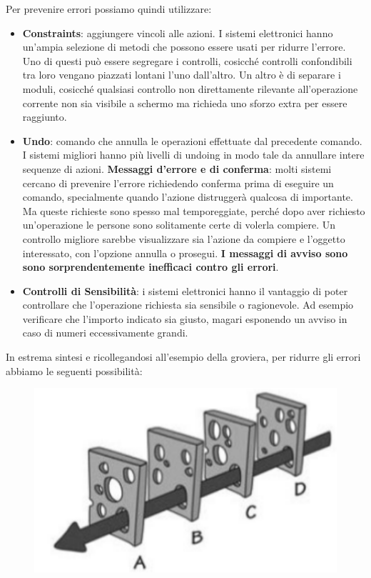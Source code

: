 \documentclass[a4paper,11pt,oneside]{book}
\begin{document}
Per prevenire errori possiamo quindi utilizzare:
\begin{itemize}
	\item \textbf{Constraints}: aggiungere vincoli alle azioni. I sistemi elettronici hanno un'ampia selezione di metodi che possono essere usati per ridurre l'errore. Uno di questi può essere segregare i controlli, cosicché controlli confondibili tra loro vengano piazzati lontani l'uno dall'altro. Un altro è di separare i moduli, cosicché qualsiasi controllo non direttamente rilevante all'operazione corrente non sia visibile a schermo ma richieda uno sforzo extra per essere raggiunto.
	\item \textbf{Undo}: comando che annulla le operazioni effettuate dal precedente comando. I sistemi migliori hanno più livelli di undoing in modo tale da annullare intere sequenze di azioni.
	      \textbf{Messaggi d'errore e di conferma}: molti sistemi cercano di prevenire l'errore richiedendo conferma prima di eseguire un comando, specialmente quando l'azione distruggerà qualcosa di importante. Ma queste richieste sono spesso mal temporeggiate, perché dopo aver richiesto un'operazione le persone sono solitamente certe di volerla compiere. Un controllo migliore sarebbe visualizzare sia l'azione da compiere e l'oggetto interessato, con l'opzione annulla o prosegui.\textbf{ I messaggi di avviso sono sono sorprendentemente inefficaci contro gli errori}.

	\item  \textbf{Controlli di Sensibilità}: i sistemi elettronici hanno il vantaggio di poter controllare che l'operazione richiesta sia sensibile o ragionevole. Ad esempio verificare che l'importo indicato sia giusto, magari esponendo un avviso in caso di numeri eccessivamente grandi.
\end{itemize}
In estrema sintesi e ricollegandosi all'esempio della groviera, per ridurre gli errori abbiamo le seguenti possibilità:

\begin{figure}[!h]
	\centering
	\includegraphics[scale=0.5]{immagini/Groviera.png}
\end{figure}
\end{document}
